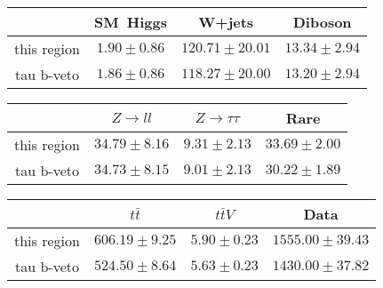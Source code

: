 \centering
\begin{tabular}{|c|c|c|c|} \hline
 & SM~Higgs & W+jets & Diboson\\\hline
this region & $1.90\pm0.86$ & $120.71\pm20.01$ & $13.34\pm2.94$\\\hline
tau b-veto & $1.86\pm0.86$ & $118.27\pm20.00$ & $13.20\pm2.94$\\\hline
\end{tabular}
\begin{tabular}{|c|c|c|c|} \hline
 & $Z\to ll$ & $Z\to \tau\tau$ & Rare\\\hline
this region & $34.79\pm8.16$ & $9.31\pm2.13$ & $33.69\pm2.00$\\\hline
tau b-veto & $34.73\pm8.15$ & $9.01\pm2.13$ & $30.22\pm1.89$\\\hline
\end{tabular}
\begin{tabular}{|c|c|c|c|} \hline
 & $t\bar{t}$ & $t\bar{t}V$ & Data\\\hline
this region & $606.19\pm9.25$ & $5.90\pm0.23$ & $1555.00\pm39.43$\\\hline
tau b-veto & $524.50\pm8.64$ & $5.63\pm0.23$ & $1430.00\pm37.82$\\\hline
\end{tabular}
